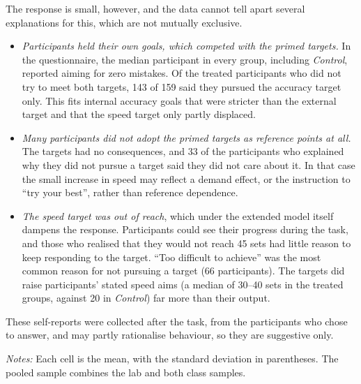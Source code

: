 \documentclass[12pt, letterpaper]{article}
\newcommand{\CtrlName}{Control}
\newcommand{\Ctrl}{\textit{\CtrlName}}
\begin{document}
The response is small, however, and the data cannot tell apart several explanations for this, which are not mutually exclusive.
\begin{itemize}
\item \emph{Participants held their own goals, which competed with the primed targets.} In the questionnaire, the median participant in every group, including \Ctrl{}, reported aiming for zero mistakes. Of the treated participants who did not try to meet both targets, 143 of 159 said they pursued the accuracy target only. This fits internal accuracy goals that were stricter than the external target and that the speed target only partly displaced.
\item \emph{Many participants did not adopt the primed targets as reference points at all.} The targets had no consequences, and 33 of the participants who explained why they did not pursue a target said they did not care about it. In that case the small increase in speed may reflect a demand effect, or the instruction to ``try your best'', rather than reference dependence.
\item \emph{The speed target was out of reach}, which under the extended model itself dampens the response. Participants could see their progress during the task, and those who realised that they would not reach 45 sets had little reason to keep responding to the target. ``Too difficult to achieve'' was the most common reason for not pursuing a target (66 participants). The targets did raise participants' stated speed aims (a median of 30--40 sets in the treated groups, against 20 in \Ctrl{}) far more than their output.
\end{itemize}
These self-reports were collected after the task, from the participants who chose to answer, and may partly rationalise behaviour, so they are suggestive only.%

\begin{table}[htbp]
\centering
\caption{Slider task performance by sample and treatment group}\label{tab:slider-performance-sumstats}
\begin{threeparttable}

\begin{tablenotes}[flushleft]
\footnotesize
\item \textit{Notes:} Each cell is the mean, with the standard deviation in parentheses. The pooled sample combines the lab and both class samples.
\end{tablenotes}
\end{threeparttable}
\end{table}
\end{document}
